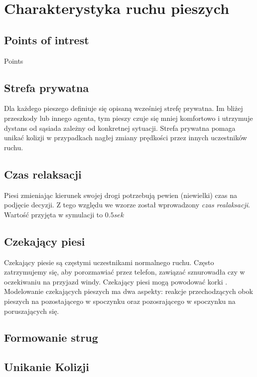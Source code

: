 \chapter{Charakterystyka ruchu pieszych}

\section{Points of intrest}
\label{sec:pointsOfInterest}
 Points
 
\section{Strefa prywatna}
\label{sec:strefaPryw}

Dla każdego pieszego definiuje się opisaną wcześniej strefę prywatna.
Im bliżej przeszkody lub innego agenta, tym pieszy czuje się mniej komfortowo i utrzymuje dystans od sąsiada zależny od konkretnej sytuacji. Strefa prywatna pomaga unikać kolizji w przypadkach nagłej zmiany prędkości przez innych uczestników ruchu.

\section{Czas relaksacji}
\label{sec:czasRelaksacji}

Piesi zmieniając kierunek swojej drogi potrzebują pewien (niewielki) czas na podjęcie decyzji. Z tego względu we wzorze został wprowadzony \textit{czas realaksacji}. Wartość przyjęta w symulacji to $0.5 sek$

\section{Czekający piesi}
\label{sec:czekajacyPiesi}

Czekający piesie są częstymi uczestnikami normalnego ruchu. Często zatrzymujemy się, aby porozmawiać przez telefon, zawiązać sznurowadła czy w oczekiwaniu na przyjazd windy. Czekający piesi mogą powodować korki \cite{6}. Modelowanie czekających pieszych ma dwa aspekty: reakcje  przechodzących obok pieszych na pozostającego w spoczynku oraz pozosrającego w spoczynku na poruszających się.

\section{Formowanie strug}
\label{sec:strugi}

\section{Unikanie Kolizji}
\label{sec:kolizje}

